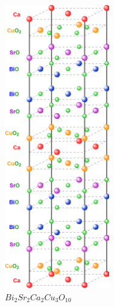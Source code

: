 \documentclass[
reprint,
amsmath,amssymb,
aps,
tikz,
border=5pt
]{revtex4-1}
\begin{document}
    \begin{figure}
    \begin{subfigure}{0.2\textwidth}
      \includegraphics[width = 0.5\textwidth]{figures/bsco.png}
      \caption{$Bi_2Sr_2Ca_{2}Cu_3O_{10}$ }
      \label{fig:ibsco}
    \end{subfigure}
    \hfill
    \begin{subfigure}{0.2\textwidth}

\end{subfigure}
\end{figure}
\end{document}
